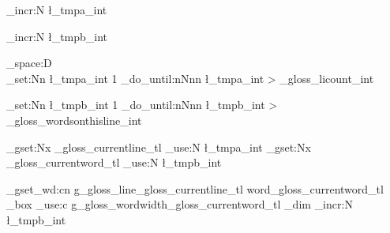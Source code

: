{{{{{								}				
			}
			
						\int_incr:N 
								\l_tmpa_int
					} 	
				\int_incr:N 
						\l_tmpb_int



		} 	
 	
  
					\tex_space:D \\[-\baselineskip] %
	\int_set:Nn
			\l_tmpa_int
			{ 1 }
 	\int_do_until:nNnn %
 		{ \l_tmpa_int } > { \g_gloss_licount_int } 
 					{
	\mfspreformat %
	
 	 				\int_set:Nn
					\l_tmpb_int
					{ 1 }
 					\int_do_until:nNnn %
 					{ \l_tmpb_int } > { \g_gloss_wordsonthisline_int } 	%
 				{
\tl_gset:Nx \g_gloss_currentline_tl { \int_use:N \l_tmpa_int }
\tl_gset:Nx \g_gloss_currentword_tl { \int_use:N \l_tmpb_int }

\box_gset_wd:cn
			{ g_gloss_line\g_gloss_currentline_tl word\g_gloss_currentword_tl _box }
			{ 
					\dim_use:c
							{ g_gloss_wordwidth\g_gloss_currentword_tl _dim }
			}
				\int_incr:N 
						\l_tmpb_int


}}}
